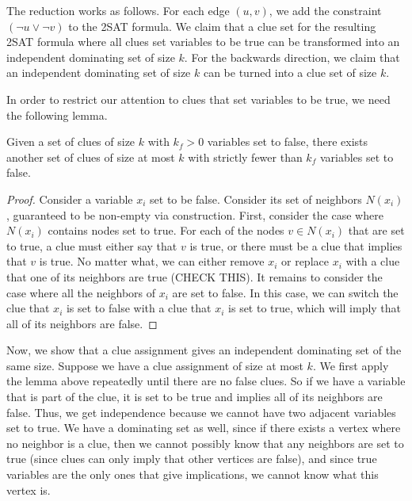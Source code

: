 \documentclass[runningheads,a4paper]{llncs}
\begin{document}
The reduction works as follows. For each edge $(u,v)$, we add the constraint $(\neg u \vee \neg v)$ to the 2SAT formula. We claim that a clue set for the resulting 2SAT formula where all clues set variables to be true can be transformed into an independent dominating set of size $k$. For the backwards direction, we claim that an independent dominating set of size $k$ can be turned into a clue set of size $k$. 

%

In order to restrict our attention to clues that set variables to be true, we need the following lemma.

\begin{lemma} Given a set of clues of size $k$ with $k_f > 0$ variables set to false, there exists another set of clues of size at most $k$ with strictly fewer than $k_f$ variables set to false.
\end{lemma}

\begin{proof} 
Consider a variable $x_i$ set to be false. Consider its set of neighbors $N(x_i)$, guaranteed to be non-empty via construction. First, consider the case where $N(x_i)$ contains nodes set to true. For each of the nodes $v \in N(x_i)$ that are set to true, a clue must either say that $v$ is true, or there must be a clue that implies that $v$ is true. No matter what, we can either remove $x_i$ or replace $x_i$ with a clue that one of its neighbors are true (CHECK THIS). It remains to consider the case where all the neighbors of $x_i$ are set to false. In this case, we can switch the clue that $x_i$ is set to false with a clue that $x_i$ is set to true, which will imply that all of its neighbors are false.
\end{proof}

Now, we show that a clue assignment gives an independent dominating set of the same size. Suppose we have a clue assignment of size at most $k$. We first apply the lemma above repeatedly until there are no false clues. So if we have a variable that is part of the clue, it is set to be true and implies all of its neighbors are false. Thus, we get independence because we cannot have two adjacent variables set to true. We have a dominating set as well, since if there exists a vertex where no neighbor is a clue, then we cannot possibly know that any neighbors are set to true (since clues can only imply that other vertices are false), and since true variables are the only ones that give implications, we cannot know what this vertex is. 
\end{document}
